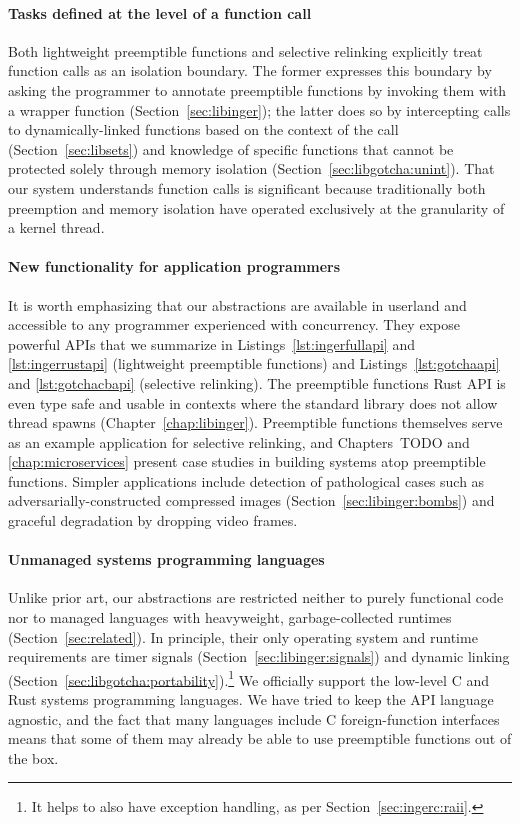 \paragraph{Tasks defined at the level of a function call}
Both lightweight preemptible functions and selective relinking explicitly treat
function calls as an isolation boundary.  The former expresses this boundary by
asking the programmer to annotate preemptible functions by invoking them with a
wrapper function (Section~\ref{sec:libinger}); the latter does so by intercepting
calls to dynamically-linked functions based on the context of the call
(Section~\ref{sec:libsets}) and knowledge of specific functions that cannot be
protected solely through memory isolation (Section~\ref{sec:libgotcha:unint}).  That
our system understands function calls is significant because traditionally both
preemption and memory isolation have operated exclusively at the granularity of a
kernel thread.

\paragraph{New functionality for application programmers}
It is worth emphasizing that our abstractions are available in userland and
accessible to any programmer experienced with concurrency.  They expose powerful APIs
that we summarize in Listings~\ref{lst:ingerfullapi} and \ref{lst:ingerrustapi}
(lightweight preemptible functions) and Listings~\ref{lst:gotchaapi} and
\ref{lst:gotchacbapi} (selective relinking).  The preemptible functions Rust API is
even type safe and usable in contexts where the standard library does not allow
thread spawns (Chapter~\ref{chap:libinger}).  Preemptible functions themselves serve
as an example application for selective relinking, and Chapters~TODO and
\ref{chap:microservices} present case studies in building systems atop preemptible
functions.  Simpler applications include detection of pathological cases such as
adversarially-constructed compressed images (Section~\ref{sec:libinger:bombs}) and
graceful degradation by dropping video frames.

\paragraph{Unmanaged systems programming languages}
Unlike prior art, our abstractions are restricted neither to purely functional code
nor to managed languages with heavyweight, garbage-collected runtimes
(Section~\ref{sec:related}).  In principle, their only operating system and runtime
requirements are timer signals (Section~\ref{sec:libinger:signals}) and dynamic
linking (Section~\ref{sec:libgotcha:portability}).\footnote{It helps to also have
exception handling, as per Section~\ref{sec:ingerc:raii}.}  We officially support the
low-level C and Rust systems programming languages.  We have tried to keep the API
language agnostic, and the fact that many languages include C foreign-function
interfaces means that some of them may already be able to use preemptible functions
out of the box.

